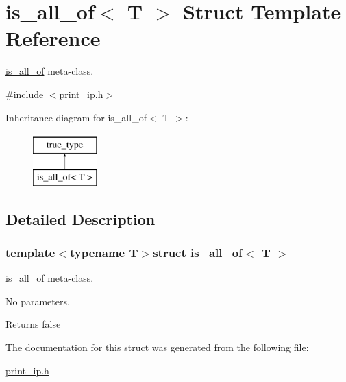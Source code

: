 \hypertarget{structis__all__of_3_01T_01_4}{\section{is\-\_\-all\-\_\-of$<$ T $>$ Struct Template Reference}
\label{structis__all__of_3_01T_01_4}
}


\hyperlink{structis__all__of}{is\-\_\-all\-\_\-of} meta-\/class.  




{\ttfamily \#include $<$print\-\_\-ip.\-h$>$}

Inheritance diagram for is\-\_\-all\-\_\-of$<$ T $>$\-:\begin{figure}[H]
\begin{center}
\leavevmode
\includegraphics[height=2.000000cm]{structis__all__of_3_01T_01_4}
\end{center}
\end{figure}


\subsection{Detailed Description}
\subsubsection*{template$<$typename T$>$struct is\-\_\-all\-\_\-of$<$ T $>$}

\hyperlink{structis__all__of}{is\-\_\-all\-\_\-of} meta-\/class. 

No parameters. \begin{DoxyReturn}{Returns}
false 
\end{DoxyReturn}


The documentation for this struct was generated from the following file\-:\begin{DoxyCompactItemize}
\item 
\hyperlink{print__ip_8h}{print\-\_\-ip.\-h}\end{DoxyCompactItemize}
